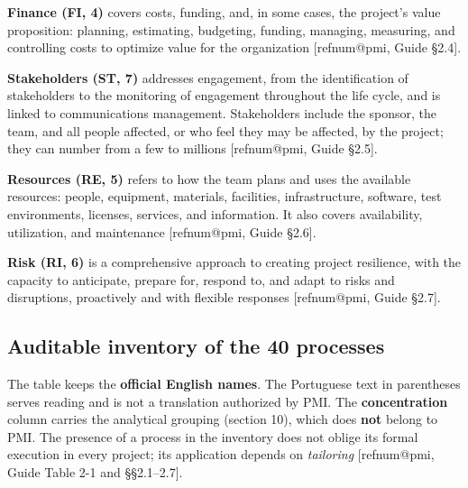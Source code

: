 \documentclass[11pt,a4paper]{article}
\makeatletter
\newcommand{\refnum}[1]{\csname refnum@#1\endcsname}
\makeatother
\begin{document}
\textbf{Finance (FI, 4)} covers costs, funding, and, in some cases, the project's value proposition: planning, estimating, budgeting, funding, managing, measuring, and controlling costs to optimize value for the organization [\refnum{pmi}, Guide §2.4].

\textbf{Stakeholders (ST, 7)} addresses engagement, from the identification of stakeholders to the monitoring of engagement throughout the life cycle, and is linked to communications management. Stakeholders include the sponsor, the team, and all people affected, or who feel they may be affected, by the project; they can number from a few to millions [\refnum{pmi}, Guide §2.5].

\textbf{Resources (RE, 5)} refers to how the team plans and uses the available resources: people, equipment, materials, facilities, infrastructure, software, test environments, licenses, services, and information. It also covers availability, utilization, and maintenance [\refnum{pmi}, Guide §2.6].

\textbf{Risk (RI, 6)} is a comprehensive approach to creating project resilience, with the capacity to anticipate, prepare for, respond to, and adapt to risks and disruptions, proactively and with flexible responses [\refnum{pmi}, Guide §2.7].
\subsection{Auditable inventory of the 40 processes}

The table keeps the \textbf{official English names}. The Portuguese text in parentheses serves reading and is not a translation authorized by PMI. The \textbf{concentration} column carries the analytical grouping (section 10), which does \textbf{not} belong to PMI. The presence of a process in the inventory does not oblige its formal execution in every project; its application depends on \textit{tailoring} [\refnum{pmi}, Guide Table 2-1 and §§2.1–2.7].
\end{document}
